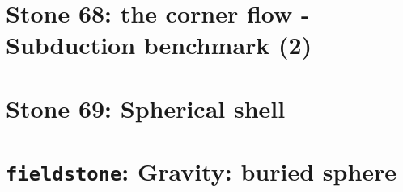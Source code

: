 \documentclass[a4paper]{article}
\begin{document}
\newpage %
\section*{
Stone 68: the corner flow - Subduction benchmark (2)
\label{f68}} 

\newpage %
\section*{
Stone 69: Spherical shell 
\label{f69}} 

























\newpage %
\section{{\tt fieldstone}: Gravity: buried sphere} %
\end{document}

